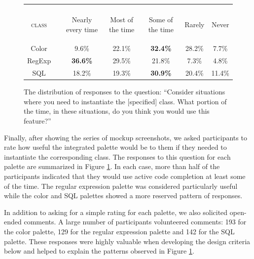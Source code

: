 \documentclass[10pt, conference, compsocconf]{IEEEtran}
\begin{document}
\begin{figure}
\begin{tabular}{crccccc}\\\\
\textsc{class}
& 
& \begin{rotate}{20}Nearly every time\end{rotate}
& \begin{rotate}{20}Most of the time\end{rotate}
& \begin{rotate}{20}Some of the time\end{rotate}
& \begin{rotate}{20}Rarely\end{rotate}
& \begin{turn}{20}Never\end{turn}\\
\hline
Color &\vline& 9.6\% & 22.1\% & \textbf{32.4\%} & 28.2\% & 7.7\%\\
RegExp &\vline& \textbf{36.6\%} & 29.5\% & 21.8\% & 7.3\% & 4.8\%\\
SQL & \vline &18.2\% & 19.3\% & \textbf{30.9\%} & 20.4\% & 11.4\%\\
\hline
\end{tabular}
\caption{The distribution of responses to the question: ``Consider situations where you need to instantiate the [specified] class. What portion of the time, in these situations, do you think you would use this feature?''}
\label{frequencies}
\end{figure}

Finally, after showing the series of mockup screenshots, we asked participants to rate how useful the integrated palette would be to them if they needed to instantiate the corresponding class. The responses to this question for each palette are summarized in Figure \ref{frequencies}. In each case, more than half of the participants indicated that they would use active code completion at least some of the time. The regular expression palette was considered particularly useful while the color and SQL palettes showed a more reserved pattern of responses. 

In addition to asking for a simple rating for each palette, we also solicited open-ended comments. A large number of participants volunteered comments: 193 for the color palette, 129 for the regular expression palette and 142 for the SQL palette. These responses were highly valuable when developing the design criteria below and helped to explain the patterns observed in Figure \ref{frequencies}.
\end{document}

